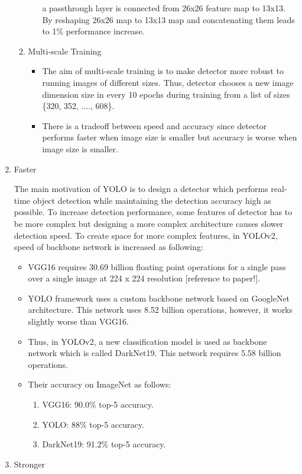 \documentclass{article}
\begin{document}
\begin{enumerate}
\begin{enumerate}
\begin{itemize}
        a passthrough layer is connected from 26x26 feature map to 13x13. By reshaping 26x26 map 
        to 13x13 map and concatenating them leads to 1\% performance increase. 
        \end{itemize}
        \item Multi-scale Training
        \begin{itemize}
            \item The aim of multi-scale training is to make detector more robust 
            to running images of different sizes. Thus, detector chooses a new 
            image dimension size in every 10 epochs during training from a list of 
            sizes \{320, 352, ...., 608\}.
            \item There is a tradeoff between speed and accuracy since detector 
            performs faster when image size is smaller but accuracy is worse when 
            image size is smaller.
        \end{itemize}
    \end{enumerate}
    \item Faster

    The main motivation of YOLO is to design a detector which performs 
    real-time object detection while maintaining the detection accuracy high 
    as possible. To increase detection performance, some features of detector 
    has to be more complex but designing a more complex architecture causes 
    slower detection speed. To create space for more complex features, in 
    YOLOv2, speed of backbone network is increased as following:
    \begin{itemize}
        \item VGG16 requires 30.69 billion floating point operations for a single 
        pass over a single image at 224 x 224 resolution [reference to paper!].
        \item YOLO framework uses a custom backbone network based on GoogleNet 
        architecture. This network uses 8.52 billion operations, however, it works 
        slightly worse than VGG16.
        \item Thus, in YOLOv2, a new classification model is used as backbone network 
        which is called DarkNet19. This network requires 5.58 billion operations.
        \item Their accuracy on ImageNet as follows:
        \begin{enumerate}
            \item VGG16: 90.0\% top-5 accuracy.
            \item YOLO: 88\% top-5 accuracy.
            \item DarkNet19: 91.2\% top-5 accuracy.
        \end{enumerate}
    \end{itemize}
    \item Stronger
    

\end{enumerate}
\end{document}
